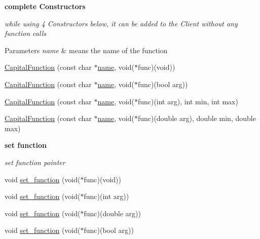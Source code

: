 \begin{Indent}{\bf complete Constructors}\par
{\em while using 4 Constructors below, it can be added to the Client without any function calls


\begin{DoxyParams}{Parameters}
{\em name} & means the name of the function \\
\hline
\end{DoxyParams}
}\begin{DoxyCompactItemize}
\item 
\hyperlink{classCapitalFunction_a89f0d476564dabdc3a5a4eefd75c0110}{Capital\-Function} (const char $\ast$\hyperlink{classCapitalFunction_af492834dfd92eb02e0c0bf915fc58755}{name}, void($\ast$func)(void))
\item 
\hyperlink{classCapitalFunction_a4b6121b145df9833019c53dde7bad362}{Capital\-Function} (const char $\ast$\hyperlink{classCapitalFunction_af492834dfd92eb02e0c0bf915fc58755}{name}, void($\ast$func)(bool arg))
\item 
\hyperlink{classCapitalFunction_a6eadfbcd622f9cb3c5d5fca694042379}{Capital\-Function} (const char $\ast$\hyperlink{classCapitalFunction_af492834dfd92eb02e0c0bf915fc58755}{name}, void($\ast$func)(int arg), int min, int max)
\item 
\hyperlink{classCapitalFunction_ad15d886cbb971ce64b0131964df5fdb0}{Capital\-Function} (const char $\ast$\hyperlink{classCapitalFunction_af492834dfd92eb02e0c0bf915fc58755}{name}, void($\ast$func)(double arg), double min, double max)
\end{DoxyCompactItemize}
\end{Indent}
\begin{Indent}{\bf set function}\par
{\em set function pointer }\begin{DoxyCompactItemize}
\item 
void \hyperlink{classCapitalFunction_a3548899a70e6c0ad633016f2c7154504}{set\-\_\-function} (void($\ast$func)(void))
\item 
void \hyperlink{classCapitalFunction_a2b27b8f4aea08075b102c102be618205}{set\-\_\-function} (void($\ast$func)(int arg))
\item 
void \hyperlink{classCapitalFunction_ab8a52f2a27c3773cd8d10b3e0136252f}{set\-\_\-function} (void($\ast$func)(double arg))
\item 
void \hyperlink{classCapitalFunction_aad7892103b04ce726a4b5d6052383df2}{set\-\_\-function} (void($\ast$func)(bool arg))
\end{DoxyCompactItemize}
\end{Indent}

